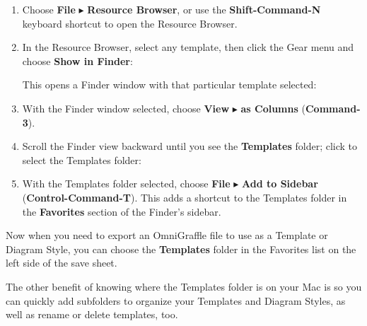 \documentclass[../main.tex]{subfiles}
\begin{document}
\begin{enumerate}
  \item Choose \textbf{File} $\blacktriangleright$ \textbf{Resource Browser}, or use the
    \textbf{Shift-Command-N} keyboard shortcut to open the Resource Browser.
  \item In the Resource Browser, select any template, then click the Gear menu and choose
    \textbf{Show in Finder}:


    This opens a Finder window with that particular template selected:

  \item With the Finder window selected, choose \textbf{View} $\blacktriangleright$ \textbf{as
    Columns} (\textbf{Command-3}).
  \item Scroll the Finder view backward until you see the \textbf{Templates} folder; click to
    select the Templates folder:

  \item With the Templates folder selected, choose \textbf{File} $\blacktriangleright$
    \textbf{Add to Sidebar} (\textbf{Control-Command-T}). This adds a shortcut to the Templates
    folder in the \textbf{Favorites} section of the Finder's sidebar.

\end{enumerate}

Now when you need to export an OmniGraffle file to use as a Template or Diagram Style, you can
choose the \textbf{Templates} folder in the Favorites list on the left side of the save sheet.


The other benefit of knowing where the Templates folder is on your Mac is so you can quickly add
subfolders to organize your Templates and Diagram Styles, as well as rename or delete
templates, too.
\end{document}

